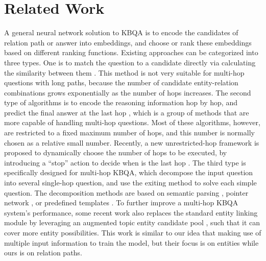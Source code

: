 \section{Related Work}
A general neural network solution to KBQA is to encode the candidates of relation path or answer into embeddings, and choose or rank these embeddings based on different ranking functions. Existing approaches can be categorized into three types. One is to match the question to a candidate directly via calculating the similarity between them \cite{DBLP:journals/corr/abs-1801-09893,DBLP:conf/adbis/YuHYZW18}. This method is not very suitable for multi-hop questions with long paths, because the number of candidate entity-relation combinations grows exponentially as the number of hops increases. The second type of algorithms is to encode the reasoning information hop by hop, and predict the final answer at the last hop \cite{DBLP:conf/emnlp/MillerFDKBW16,DBLP:conf/coling/ZhouHZ18}, which is a group of methods that are more capable of handling multi-hop questions. Most of these algorithms, however, are restricted to a fixed maximum number of hops, and this number is normally chosen as a relative small number. Recently, a new unrestricted-hop framework is proposed to dynamically choose the number of hops to be executed, by introducing a ``stop'' action to decide when is the last hop \cite{DBLP:conf/naacl/ChenCCNK19}. The third type is specifically designed for multi-hop KBQA, which decompose the input question into several single-hop question, and use the exiting method to solve each simple question. The decomposition methods are based on semantic parsing \cite{DBLP:conf/www/AbujabalYRW17,DBLP:conf/emnlp/LuoLLZ18}, pointer network \cite{DBLP:conf/acl/MinZZH19}, or predefined templates \cite{DBLP:journals/pvldb/ZhengYZC18,DBLP:journals/corr/abs-1807-09623}.  %
 To further improve a multi-hop KBQA system's performance, some recent work also replaces the standard entity linking module by leveraging an augmented topic entity candidate pool \cite{DBLP:conf/ijcai/LanW019}, such that it can cover more entity possibilities. This work is similar to our idea that making use of multiple input information to train the model, but their focus is on entities while ours is on relation paths.
